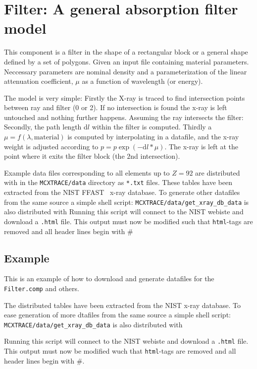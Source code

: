 \section{Filter: A general absorption filter model}
\label{s:filter}

This component is a filter in the shape of a rectangular block or a general
shape defined by a set of polygons. Given an input file containing material
parameters. Neccessary parameters are nominal density and a parameterization of
the linear attenuation coefficient, $\mu$ as a function of wavelength (or
energy).

The model is very simple: Firstly the X-ray is traced to find intersection points between ray and filter (0 or 2).
If no intersection is found the x-ray is left untouched and nothing further happens.
Assuming the ray intersects the filter: Secondly, the path length d$l$ within the filter is computed.
Thirdly a $\mu = f(\lambda,\mathrm{material})$ is computed by interpolating in
a datafile, and the x-ray weight is adjusted according to
$p=p\exp(-\mathrm{d}l*\mu)$. The x-ray is left at the point where it exits the
filter block (the $2$nd intersection).

Example data files corresponding to all elements up to $Z=92$ are distributed with \MCX in the
\verb+MCXTRACE/data+ directory as \verb+*.txt+ files. These tables have been
extracted from the NIST FFAST~\cite{NIST-ffast} x-ray database.
To generate other datafiles from the same source a simple shell script:
\verb+MCXTRACE/data/get_xray_db_data+ is also distributed with \MCX
Running this script will connect to the NIST webiste and download a
\verb+.html+ file. This output must now be modified such that \verb+html+-tags
are removed and all header lines begin with $\#$

\subsection{Example}
\label{getNISTdata}
This is an example of how to download and generate datafiles for the \verb+Filter.comp+ and others.

The distributed tables have been extracted from the NIST x-ray database. To ease generation of more dtafiles
from the same source a simple shell script: \verb+MCXTRACE/data/get_xray_db_data+ is also distributed with \MCX

Running this script will connect to the NIST webiste and download a \verb+.html+ file. This output must now be modified wuch that \verb+html+-tags
are removed and all header lines begin with $\#$.

